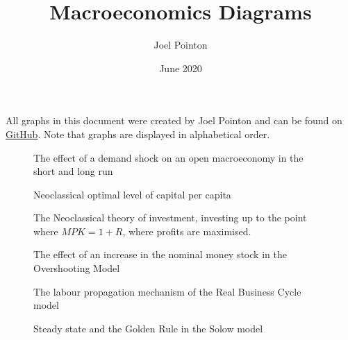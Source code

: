 \documentclass{article}
\title{Macroeconomics Diagrams}
\author{Joel Pointon}
\date{June 2020}
\begin{document}
\maketitle
All graphs in this document were created by Joel Pointon and can be found on \href{https://github.com/pointonjoel/TeXonomics}{GitHub}. Note that graphs are displayed in alphabetical order.

\listoffigures

\pagebreak

\begin{figure}[H]
    \centering
    
    \caption{The effect of a demand shock on an open macroeconomy in the short and long run}
    \label{fig:1}
\end{figure}
\begin{figure}[H]
    \centering
    
    \caption{Neoclassical optimal level of capital per capita}
    \label{fig:2}
\end{figure}
\begin{figure}[ht]
	\begin{subfigure}{\textwidth}
		\centering
		 
	\end{subfigure}
	\begin{subfigure}{\textwidth}
		\centering
		  
	\end{subfigure}
	\caption{The Neoclassical theory of investment, investing up to the point where $MPK=1+R$, where profits are maximised.}
	\label{fig:3}
\end{figure}
\begin{figure}[H]
    \centering
    
    \caption{The effect of an increase in the nominal money stock in the Overshooting Model}
    \label{fig:4}
\end{figure}
\begin{figure}[H]
    \centering
    
    \caption{The labour propagation mechanism of the Real Business Cycle model}
    \label{fig:5}
\end{figure}
\begin{figure}[H]
    \centering
    
    \caption{Steady state and the Golden Rule in the Solow model}
    \label{fig:6}
\end{figure}
\end{document}
